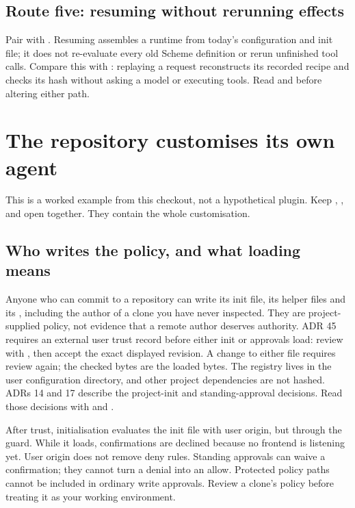 \section{Route five: resuming without rerunning effects}

Pair  with .
Resuming assembles a runtime from today's configuration and init file;
it does not re-evaluate every old Scheme definition or rerun unfinished
tool calls. Compare this with : replaying
a request reconstructs its recorded recipe and checks its hash without
asking a model or executing tools. Read
 and
 before altering either path.

\chapter{The repository customises its own agent}
\label{chap:repo-customisation}

This is a worked example from this checkout, not a hypothetical plugin.
Keep , ,  and
 open together. They contain the whole customisation.

\section{Who writes the policy, and what loading means}

Anyone who can commit to a repository can write its init file, its helper
files and its , including the author of a clone
you have never inspected. They are project-supplied policy, not evidence
that a remote author deserves authority. ADR 45 requires an external user trust
record before either init or approvals load: review with ,
then accept the exact displayed revision. A change to either file requires
review again; the checked bytes are the loaded bytes. The registry lives in
the user configuration directory, and other project dependencies are not hashed.
ADRs 14 and 17 describe the
project-init and standing-approval decisions. Read those decisions with
 and .

After trust, initialisation evaluates the init file with user origin, but through the
guard. While it loads, confirmations are declined because no frontend is
listening yet. User origin does not remove deny rules. Standing approvals
can waive a confirmation; they cannot turn a denial into an allow.
Protected policy paths cannot be included in ordinary write approvals.
Review a clone's policy before treating it as your working environment.

